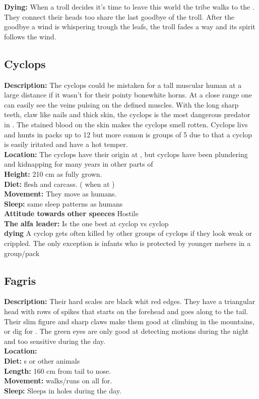 \documentclass{article}
\begin{document}
\textbf{Dying: } When a troll decides it's time to leave this world the tribe walks to the . They connect their heads too share the last goodbye of the troll. After the goodbye a wind is whispering trough the leafs, the troll fades a way and its spirit follows the wind.




\subsection{Cyclops}
\label{cyclops}

\textbf{Description:} The cyclops could be mistaken for a tall muscular human at a large distance if it wasn't for their pointy bonewhite horns. At a close range one can easily see the veins pulsing on the defined muscles. With the long sharp teeth, claw like nails and thick skin, the cyclops is the most dangerous predator in . The stained blood on the skin makes the cyclops smell rotten. Cyclops livs and hunts in packs up to 12 but more comon is groups of 5 due to that a cyclop is easily iritated and have a hot temper.    
\\\textbf{Location:} The cyclops have their origin at , but cyclops have been plundering and kidnapping for many years in other parts of 
\\\textbf{Height:} 210 cm as fully grown.
\\\textbf{Diet:} flesh and carcass. ( when at )
\\\textbf{Movement: } They move as humans.
\\\textbf{Sleep: } same sleep patterns as humans
\\\textbf{Attitude towards other speeces} Hostile
\\\textbf{The alfa leader:} Is the one best at cyclop vs cyclop
\\\textbf{dying} A cyclop gets often killed by other groups of cyclops if they look weak or crippled. The only exception is infants who is protected by younger mebers in a group/pack
\subsection{Fagris}
\label{lizard}

\textbf{Description: } Their hard scales are black whit red edges. They have a triangular head with rows of spikes that starts on the forehead and  goes along to the tail. Their slim figure and sharp claws make them good at climbing in the mountains, or dig for . The  green eyes are only good at detecting motions during the night and too sensitive during the day.
\\\textbf{Location: }
\\\textbf{Diet: }s or other animals
\\\textbf{Length: } 160 cm from tail to nose.
\\\textbf{Movement: } walks/runs on all for.
\\\textbf{Sleep: } Sleeps in holes during the day.
\end{document}

